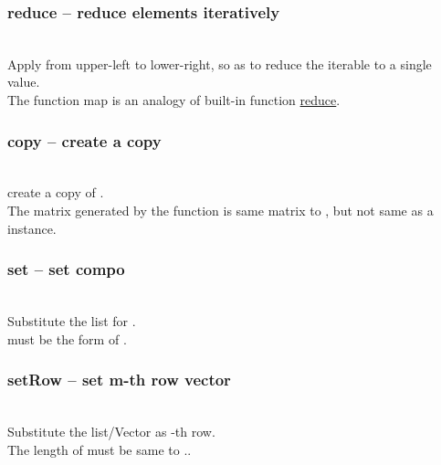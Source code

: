  \subsubsection{reduce -- reduce elements iteratively}
   \\
   \spacing
   \quad Apply  from upper-left to lower-right, so as to reduce the iterable to a single value.\\
   \spacing
   \quad \negok The function map is an analogy of built-in function \href{http://docs.python.org/library/functions.html#reduce}{reduce}.\\
   \spacing
 \subsubsection{copy -- create a copy}
   \\
   \spacing
   \quad create a copy of .\\
   \spacing
   \quad \negok The matrix generated by the function is same matrix to , but not same as a instance.\\
   \spacing
  \subsubsection{set -- set compo}
   \\
   \spacing
   \quad Substitute the list  for .\\
   \spacing
   \quad {} must be the form of .\\
  \subsubsection{setRow -- set m-th row vector}
   \\
   \spacing
   \quad Substitute the list/Vector  as -th row.\\
   \spacing
   \quad The length of  must be same to ..\\

